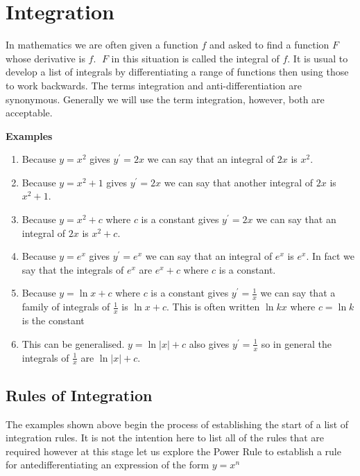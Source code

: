 \chapter{Integration}
In mathematics we are often given a function $f$ and asked to find a function $F$ whose derivative is $f$. $\;F$ in this situation is called the integral of $f$. 
It is usual to develop a list of integrals by differentiating a range of functions then using those to work backwards. The terms integration and anti-differentiation are synonymous. Generally we will use the term integration, however, both are acceptable.

\textbf{Examples}
\begin{enumerate}
\item Because $y =x^{2}$ gives $y^{ \prime } =2 x$ we can say that an integral of $2 x$ is $x^{2}$. 

\item Because $y =x^{2} +1$ gives $y^{ \prime } =2 x$ we can say that another integral of $2 x$ is $x^{2} +1$. 

\item Because $y =x^{2} +c$ where $c$ is a constant gives $y^{ \prime } =2 x$ we can say that an integral of $2 x$ is $x^{2} +c$. 

\item Because $y =e^{x}$ gives $y^{ \prime } =e^{x}$ we can say that an integral of $e^{x}$ is $e^{x}$. In fact we say that the integrals of $e^{x}$ are $e^{x} +c$ where $c$ is a constant. 

\item Because $y =\ln  x +c$ where $c$ is a constant gives $y^{ \prime } =\frac{1}{x}$ we can say that a family of integrals of $\frac{1}{x}$ is $\ln  x +c$. This is often written $\ln  k x$ where $c =\ln  k$ is the constant 

\item This can be generalised. $y =\ln  \left \vert x\right \vert  +c$ also gives $y^{ \prime } =\frac{1}{x}$ so in general the integrals of $\frac{1}{x}$ are $\ln  \left \vert x\right \vert  +c$. \end{enumerate}


\section{Rules of Integration}
The examples shown above begin the process of establishing the start of a list of integration rules. It
is not the intention here to list all of the rules that are required however at this stage let us explore the Power Rule to establish a rule for antedifferentiating
an expression of the form $y =x^{n}$ 

